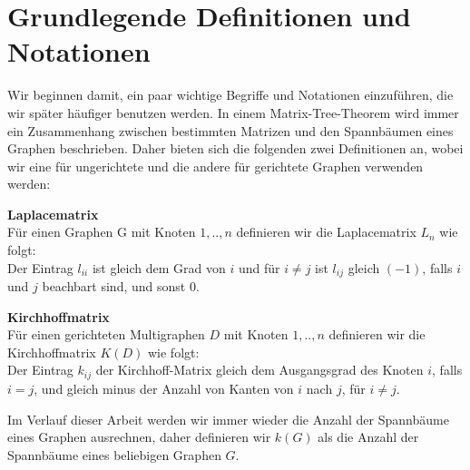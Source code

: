 \graphicspath{{grafiken/}}

\section{Grundlegende Definitionen und Notationen}
Wir beginnen damit, ein paar wichtige Begriffe und Notationen einzuführen, die wir später häufiger benutzen werden.
In einem Matrix-Tree-Theorem wird immer ein Zusammenhang zwischen bestimmten Matrizen und den Spannbäumen eines Graphen beschrieben. Daher bieten sich die folgenden zwei Definitionen an, wobei wir eine für ungerichtete und die andere für gerichtete Graphen verwenden werden:
\begin{Df}\textbf{Laplacematrix}\\
Für einen Graphen G mit Knoten $1,..,n$ definieren wir die Laplacematrix $L_n$ wie folgt:\\
Der Eintrag $l_{ii}$ ist gleich dem Grad von $i$ und für $i \neq j$ ist $l_{ij}$ gleich $(-1)$, falls $i$ und $j$ beachbart sind, und sonst $0$.
\end{Df}
\begin{Df}\textbf{Kirchhoffmatrix}\\
 Für einen gerichteten Multigraphen $D$ mit Knoten $1,..,n$ definieren wir die Kirchhoffmatrix $K(D)$ wie folgt:\\
 Der Eintrag $k_{ij}$ der Kirchhoff-Matrix gleich dem Ausgangsgrad des Knoten $i$, falls $i=j$, und gleich minus der Anzahl von Kanten von $i$ nach $j$, für $i \neq j$.
\end{Df}
Im Verlauf dieser Arbeit werden wir immer wieder die Anzahl der Spannbäume eines Graphen ausrechnen, daher definieren wir $\mathit{k}(G)$ als die Anzahl der Spannbäume eines beliebigen Graphen $G$.

